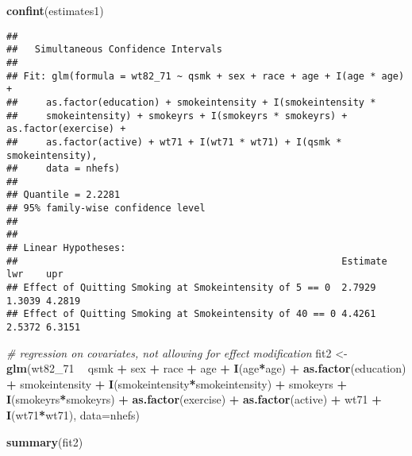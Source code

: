 \documentclass[
  10pt,
]{book}
\newenvironment{Shaded}{\begin{snugshade}}{\end{snugshade}}
\newcommand{\CommentTok}[1]{\textcolor[rgb]{0.56,0.35,0.01}{\textit{#1}}}
\newcommand{\DataTypeTok}[1]{\textcolor[rgb]{0.13,0.29,0.53}{#1}}
\newcommand{\DecValTok}[1]{\textcolor[rgb]{0.00,0.00,0.81}{#1}}
\newcommand{\KeywordTok}[1]{\textcolor[rgb]{0.13,0.29,0.53}{\textbf{#1}}}
\newcommand{\NormalTok}[1]{#1}
\newcommand{\OperatorTok}[1]{\textcolor[rgb]{0.81,0.36,0.00}{\textbf{#1}}}
\newcommand{\StringTok}[1]{\textcolor[rgb]{0.31,0.60,0.02}{#1}}
\begin{document}
\begin{Shaded}
\begin{Highlighting}[]
  \KeywordTok{confint}\NormalTok{(estimates1)}
\end{Highlighting}
\end{Shaded}

\begin{verbatim}
## 
##   Simultaneous Confidence Intervals
## 
## Fit: glm(formula = wt82_71 ~ qsmk + sex + race + age + I(age * age) + 
##     as.factor(education) + smokeintensity + I(smokeintensity * 
##     smokeintensity) + smokeyrs + I(smokeyrs * smokeyrs) + as.factor(exercise) + 
##     as.factor(active) + wt71 + I(wt71 * wt71) + I(qsmk * smokeintensity), 
##     data = nhefs)
## 
## Quantile = 2.2281
## 95% family-wise confidence level
##  
## 
## Linear Hypotheses:
##                                                         Estimate lwr    upr   
## Effect of Quitting Smoking at Smokeintensity of 5 == 0  2.7929   1.3039 4.2819
## Effect of Quitting Smoking at Smokeintensity of 40 == 0 4.4261   2.5372 6.3151
\end{verbatim}

\begin{Shaded}
\begin{Highlighting}[]
\CommentTok{# regression on covariates, not allowing for effect modification}
\NormalTok{fit2 <-}\StringTok{ }\KeywordTok{glm}\NormalTok{(wt82_}\DecValTok{71} \OperatorTok{~}\StringTok{ }\NormalTok{qsmk }\OperatorTok{+}\StringTok{ }\NormalTok{sex }\OperatorTok{+}\StringTok{ }\NormalTok{race }\OperatorTok{+}\StringTok{ }\NormalTok{age }\OperatorTok{+}\StringTok{ }\KeywordTok{I}\NormalTok{(age}\OperatorTok{*}\NormalTok{age) }\OperatorTok{+}\StringTok{ }\KeywordTok{as.factor}\NormalTok{(education)}
           \OperatorTok{+}\StringTok{ }\NormalTok{smokeintensity }\OperatorTok{+}\StringTok{ }\KeywordTok{I}\NormalTok{(smokeintensity}\OperatorTok{*}\NormalTok{smokeintensity) }\OperatorTok{+}\StringTok{ }\NormalTok{smokeyrs}
           \OperatorTok{+}\StringTok{ }\KeywordTok{I}\NormalTok{(smokeyrs}\OperatorTok{*}\NormalTok{smokeyrs) }\OperatorTok{+}\StringTok{ }\KeywordTok{as.factor}\NormalTok{(exercise) }\OperatorTok{+}\StringTok{ }\KeywordTok{as.factor}\NormalTok{(active)}
           \OperatorTok{+}\StringTok{ }\NormalTok{wt71 }\OperatorTok{+}\StringTok{ }\KeywordTok{I}\NormalTok{(wt71}\OperatorTok{*}\NormalTok{wt71), }\DataTypeTok{data=}\NormalTok{nhefs)}
  
\KeywordTok{summary}\NormalTok{(fit2)}
\end{Highlighting}
\end{Shaded}
\end{document}

